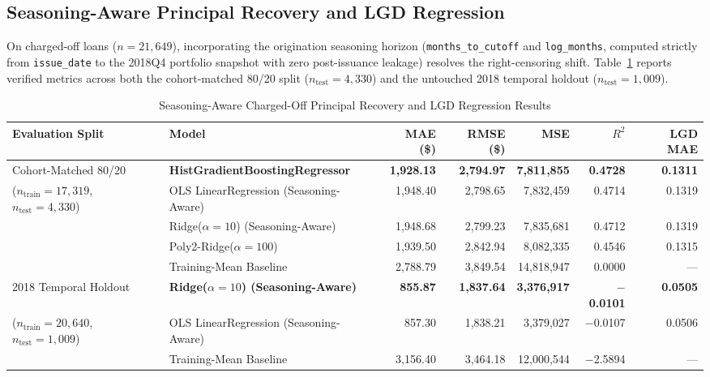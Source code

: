 \documentclass[conference]{IEEEtran}
\begin{document}
\subsection{Seasoning-Aware Principal Recovery and LGD Regression}
On charged-off loans ($n=21{,}649$), incorporating the origination seasoning horizon (\texttt{months\_to\_cutoff} and \texttt{log\_months}, computed strictly from \texttt{issue\_date} to the 2018Q4 portfolio snapshot with zero post-issuance leakage) resolves the right-censoring shift. Table~\ref{tab:regression_results} reports verified metrics across both the cohort-matched 80/20 split ($n_{\text{test}}=4{,}330$) and the untouched 2018 temporal holdout ($n_{\text{test}}=1{,}009$).
\begin{table}[!t]
\caption{Seasoning-Aware Charged-Off Principal Recovery and LGD Regression Results}
\label{tab:regression_results}
\centering
\footnotesize
\begin{tabularx}{\textwidth}{@{}l X r r r r r@{}}
\toprule
\textbf{Evaluation Split} & \textbf{Model} & \textbf{MAE (\$)} & \textbf{RMSE (\$)} & \textbf{MSE} & \textbf{$R^2$} & \textbf{LGD MAE}\\
\midrule
Cohort-Matched 80/20 & \textbf{HistGradientBoostingRegressor} & \textbf{1,928.13} & \textbf{2,794.97} & \textbf{7,811,855} & \textbf{0.4728} & \textbf{0.1311}\\
($n_{\text{train}}=17{,}319$, $n_{\text{test}}=4{,}330$) & OLS LinearRegression (Seasoning-Aware) & 1,948.40 & 2,798.65 & 7,832,459 & 0.4714 & 0.1319\\
 & Ridge($\alpha=10$) (Seasoning-Aware) & 1,948.68 & 2,799.23 & 7,835,681 & 0.4712 & 0.1319\\
 & Poly2-Ridge($\alpha=100$) & 1,939.50 & 2,842.94 & 8,082,335 & 0.4546 & 0.1315\\
 & Training-Mean Baseline & 2,788.79 & 3,849.54 & 14,818,947 & 0.0000 & ---\\
\midrule
2018 Temporal Holdout & \textbf{Ridge($\alpha=10$) (Seasoning-Aware)} & \textbf{855.87} & \textbf{1,837.64} & \textbf{3,376,917} & \textbf{$-$0.0101} & \textbf{0.0505}\\
($n_{\text{train}}=20{,}640$, $n_{\text{test}}=1{,}009$) & OLS LinearRegression (Seasoning-Aware) & 857.30 & 1,838.21 & 3,379,027 & $-$0.0107 & 0.0506\\
 & Training-Mean Baseline & 3,156.40 & 3,464.18 & 12,000,544 & $-$2.5894 & ---\\
\bottomrule
\end{tabularx}
\end{table}
\end{document}
